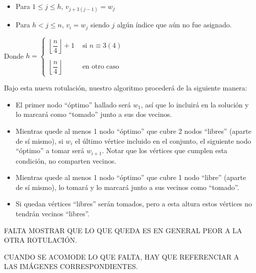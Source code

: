 \begin{itemize}
\item Para $1 \leq j \leq h$, $v_{j+3(j-1)} = w_j$
\item Para $h < j \leq n$, $v_i = w_j$ siendo $j$ algún índice que aún no fue asignado.
\end{itemize}

Donde $h =
\begin{cases}
\left\lfloor \dfrac{n}{4} \right\rfloor + 1 & \text{ si } n \equiv 3 (4)\\\\
\left\lfloor \dfrac{n}{4} \right\rfloor & \text{ en otro caso }
\end{cases}$

Bajo esta nueva rotulación, nuestro algoritmo procederá de la siguiente manera:

\begin{itemize}
\item El primer nodo ``óptimo'' hallado será $w_1$, así que lo incluirá en la solución y lo marcará como ``tomado'' junto a sus dos vecinos. 
\item Mientras quede al menos 1 nodo ``óptimo'' que cubre 2 nodos ``libres'' (aparte de sí mismo), si $w_i$ el último vértice incluido en el conjunto, el siguiente nodo ``óptimo'' a tomar será $w_{i+1}$.  Notar que los vértices que cumplen esta condición, no comparten vecinos.
\item Mientras quede al menos 1 nodo ``óptimo'' que cubre 1 nodo ``libre'' (aparte de sí mismo), lo tomará y lo marcará junto a sus vecinos como ``tomado''.
\item Si quedan vértices ``libres'' serán tomados, pero a esta altura estos vértices no tendrán vecinos ``libres''.
\end{itemize}

FALTA MOSTRAR QUE LO QUE QUEDA ES EN GENERAL PEOR A LA OTRA ROTULACIÓN.

CUANDO SE ACOMODE LO QUE FALTA, HAY QUE REFERENCIAR A LAS IMÁGENES CORRESPONDIENTES.




